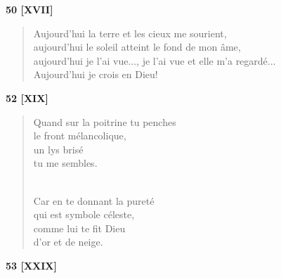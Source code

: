 \documentclass[a4paper,12pt]{book}
\begin{document}
\bigskip

\begin{center} {\bf 50 [XVII]} \end{center}

\begin{verse}
Aujourd'hui la terre et les cieux me sourient, \\
aujourd'hui le soleil atteint le fond de mon âme, \\
aujourd'hui je l'ai vue..., je l'ai vue et elle m'a regardé... \\
Aujourd'hui je crois en Dieu! \\
\end{verse}

\bigskip

\begin{center} {\bf 52 [XIX]} \end{center}

\begin{verse}
Quand sur la poitrine tu penches \\
le front mélancolique, \\
un lys brisé \\
tu me sembles. \\ \

Car en te donnant la pureté \\
qui est symbole céleste, \\
comme lui te fit Dieu \\
d'or et de neige. \\
\end{verse}


\begin{center} {\bf 53 [XXIX]} \end{center}
\end{document}
